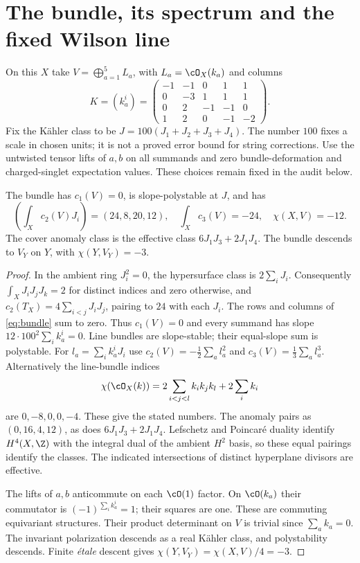 \section{The bundle, its spectrum and the fixed Wilson line}\label{sec:fixedbundle}
On this $X$ take $V=\bigoplus_{a=1}^5 L_a$, with $L_a=\cO_X(k_a)$
and columns
\begin{equation}\label{eq:bundle}
 K=(k_a^i)=\begin{pmatrix}
 -1&-1&0&1&1\\0&-3&1&1&1\\0&2&-1&-1&0\\1&2&0&-1&-2
 \end{pmatrix}.
\end{equation}
Fix the K\"ahler class to be $J=100(J_1+J_2+J_3+J_4)$.
The number $100$ fixes a scale in chosen units; it is not a proved
error bound for string corrections. Use the untwisted tensor lifts
of $a,b$ on all summands and zero bundle-deformation and charged-singlet
expectation values. These choices remain fixed in the audit below.

\begin{proposition}\label{prop:cover}
The bundle has $c_1(V)=0$, is slope-polystable at $J$, and has
\[
 \left(\int_X c_2(V)J_i\right)=(24,8,20,12),\quad
 \int_Xc_3(V)=-24,\quad\chi(X,V)=-12.
\]
The cover anomaly class is the effective class $6J_1J_3+2J_1J_4$.
The bundle descends to $V_Y$ on $Y$, with $\chi(Y,V_Y)=-3$.
\end{proposition}
\begin{proof}
In the ambient ring $J_i^2=0$, the hypersurface class is $2\sum_iJ_i$.
Consequently $\int_XJ_iJ_jJ_k=2$ for distinct indices and zero otherwise,
and $c_2(T_X)=4\sum_{i<j}J_iJ_j$, pairing to $24$ with each $J_i$.
The rows and columns of \eqref{eq:bundle} sum to zero. Thus $c_1(V)=0$
and every summand has slope $12\cdot100^2\sum_i k_a^i=0$.
Line bundles are slope-stable; their equal-slope sum is polystable.
For $l_a=\sum_i k_a^iJ_i$ use
$c_2(V)=-\tfrac12\sum_a l_a^2$ and $c_3(V)=\tfrac13\sum_a l_a^3$.
Alternatively the line-bundle indices
\[
 \chi(\cO_X(k))=2\sum_{i<j<l}k_i k_j k_l+2\sum_i k_i
\]
are $0,-8,0,0,-4$. These give the stated numbers.
The anomaly pairs as $(0,16,4,12)$, as does $6J_1J_3+2J_1J_4$.
Lefschetz and Poincar\'e duality identify $H^4(X,\Z)$ with the integral
dual of the ambient $H^2$ basis, so these equal pairings identify the
classes. The indicated intersections of distinct hyperplane divisors
are effective.

The lifts of $a,b$ anticommute on each $\cO(1)$ factor. On
$\cO(k_a)$ their commutator is $(-1)^{\sum_i k_a^i}=1$; their squares
are one. These are commuting equivariant structures. Their product
determinant on $V$ is trivial since $\sum_a k_a=0$. The invariant
polarization descends as a real K\"ahler class, and polystability descends.
Finite \emph{\'etale} descent gives $\chi(Y,V_Y)=\chi(X,V)/4=-3$.
\end{proof}

